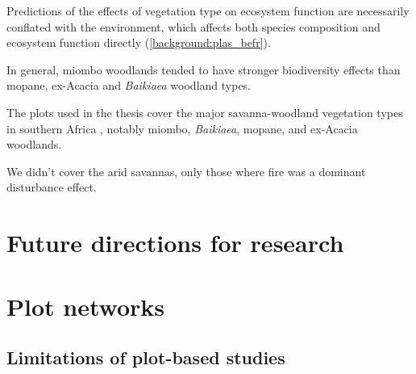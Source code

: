 \begin{refsection}
Predictions of the effects of vegetation type on ecosystem function are necessarily conflated with the environment, which affects both species composition and ecosystem function directly (\autoref{background:plas_befr}). 

In general, miombo woodlands tended to have stronger biodiversity effects than mopane, ex-Acacia and \textit{Baikiaea} woodland types. 

The plots used in the thesis cover the major savanna-woodland vegetation types in southern Africa \citep{}, notably miombo, \textit{Baikiaea}, mopane, and ex-Acacia woodlands.

We didn't cover the arid savannas, only those where fire was a dominant disturbance effect. 

\section{Future directions for research}


\section{Plot networks}

\subsection{Limitations of plot-based studies}


\end{refsection}
